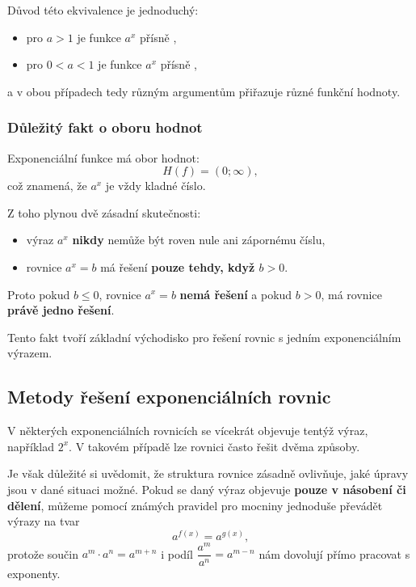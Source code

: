 \documentclass[12pt,a4paper]{article}
\begin{document}
Důvod této ekvivalence je jednoduchý:

\begin{itemize}
    \item pro $a>1$ je funkce $a^x$ přísně ,  
    \item pro $0<a<1$ je funkce $a^x$ přísně ,
\end{itemize}

\noindent
a v obou případech tedy různým argumentům přiřazuje různé funkční hodnoty.

\subsubsection*{Důležitý fakt o oboru hodnot}

Exponenciální funkce má obor hodnot:
\[
H(f) = (0;\infty),
\]
což znamená, že $a^x$ je vždy kladné číslo.

Z toho plynou dvě zásadní skutečnosti:

\begin{itemize}
    \item výraz $a^x$ \textbf{nikdy} nemůže být roven nule ani zápornému číslu,
    \item rovnice $a^x = b$ má řešení \textbf{pouze tehdy, když $b>0$}.
\end{itemize}

Proto pokud $b \le 0$, rovnice $a^x = b$ \textbf{nemá řešení} a pokud $b > 0$, má rovnice \textbf{právě jedno řešení}.

Tento fakt tvoří základní východisko pro řešení rovnic s jedním exponenciálním výrazem.


\newpage
\subsection{Metody řešení exponenciálních rovnic}

V některých exponenciálních rovnicích se vícekrát objevuje tentýž výraz,
například $2^x$. V takovém případě lze rovnici často řešit dvěma způsoby.

Je však důležité si uvědomit, že struktura rovnice zásadně ovlivňuje,
jaké úpravy jsou v dané situaci možné. Pokud se daný výraz objevuje
\textbf{pouze v násobení či dělení}, můžeme pomocí známých pravidel pro
mocniny jednoduše převádět výrazy na tvar
\[
    a^{f(x)} = a^{g(x)},
\]
protože součin $a^m \cdot a^n = a^{m+n}$ i podíl
$\dfrac{a^m}{a^n} = a^{m-n}$ nám dovolují přímo pracovat s exponenty.
\end{document}
